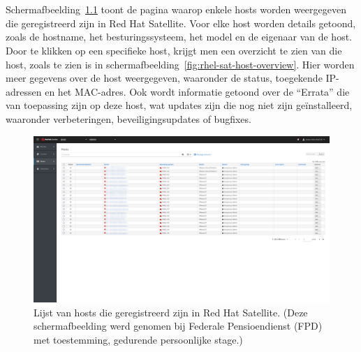 
\chapter{}%
\label{ch:bijlage_red_hat_satellite}

Schermafbeelding~\ref{fig:rhel-sat-hosts} toont de pagina waarop enkele hosts worden weergegeven die geregistreerd zijn in Red Hat Satellite.
Voor elke host worden details getoond, zoals de hostname, het besturingssysteem, het model en de eigenaar van de host.
Door te klikken op een specifieke host, krijgt men een overzicht te zien van die host, zoals te zien is in schermafbeelding~\ref{fig:rhel-sat-host-overview}.
Hier worden meer gegevens over de host weergegeven, waaronder de status, toegekende IP-adressen en het MAC-adres.
Ook wordt informatie getoond over de ``Errata'' die van toepassing zijn op deze host, wat updates zijn die nog niet zijn ge\"installeerd, waaronder verbeteringen, beveiligingsupdates of bugfixes.

\begin{figure}[h!]
    \includegraphics[width=\textwidth]
    {./graphics/state-of-the-art/rhel-satellite/rhel-sat-hosts.png}
    \caption[Hosts geregistreerd in Red Hat Satellite.]{\label{fig:rhel-sat-hosts}Lijst van hosts die geregistreerd zijn in Red Hat Satellite. (Deze schermafbeelding werd genomen bij Federale Pensioendienst (FPD) met toestemming, gedurende persoonlijke stage.)}
\end{figure}


